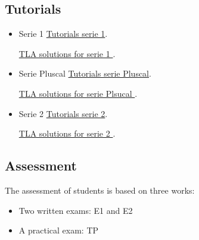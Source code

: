 \documentclass[ 12pt]{article}
\begin{document}
  

\subsection{Tutorials}

  \begin{itemize}
  \item[]   Serie  1
    \href{http://mery54.github.io/teaching/aspd/lecturesnotes/aspd-app-td1.pdf}{Tutorials 
      serie 1}.

        \href{http://mery54.github.io/teaching/aspd/models/tlatd1.zip}{TLA 
           solutions for serie 1
         }.

\item[]   Serie  Pluscal
    \href{http://mery54.github.io/teaching/aspd/lecturesnotes/aspd-app-pluscal.pdf}{Tutorials 
      serie Pluscal}.

        \href{http://mery54.github.io/teaching/aspd/models/tdpluscal.zip}{TLA 
           solutions for serie Plsucal
         }.
         

         
\item[]   Serie  2
    \href{http://mery54.github.io/teaching/aspd/lecturesnotes/aspd-app-td2.pdf}{Tutorials 
      serie 2}.

        \href{http://mery54.github.io/teaching/aspd/models/tlatd2.zip}{TLA 
           solutions for serie 2
         }.

           \end{itemize}

  
  
  \subsection{Assessment}
\label{sec:project}

The assessment  of students is based on three works:
\begin{itemize}
\item Two  written  exams: E1 and E2
\item  A practical exam: TP
 \end{itemize}





\end{document}
